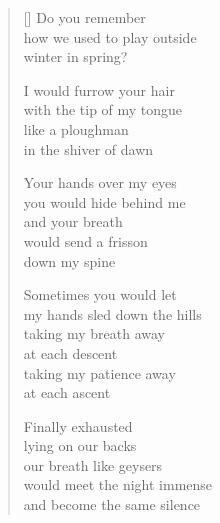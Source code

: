 \documentclass[12pt,a4paper]{article}
\begin{document}
\begin{verse}[\versewidth]
  Do you remember \\
  how we used to play outside \\
  winter in spring?

  I would furrow your hair \\
  with the tip of my tongue \\
  like a ploughman \\
  in the shiver of dawn

  Your hands over my eyes \\
  you would hide behind me \\
  and your breath \\
  would send a frisson \\
  down my spine

  Sometimes you would let \\
  my hands sled down the hills \\
  taking my breath away \\
  at each descent \\
  taking my patience away \\
  at each ascent

  Finally exhausted \\
  lying on our backs \\
  our breath like geysers \\
  would meet the night immense \\
  and become the same silence
\end{verse}
\end{document}
